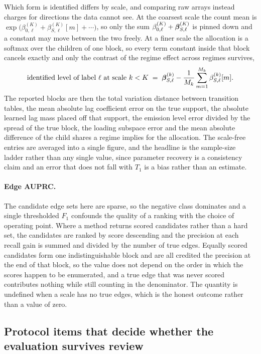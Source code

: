 Which form is identified differs by scale, and comparing raw arrays instead
charges for directions the data cannot see. At the coarsest scale the count
mean is
\(\exp\bigl(\beta_{0,\ell}^{(K)} + \beta_{S,\ell}^{(K)}[m] + \cdots\bigr)\), so
only the sum \(\beta_{0,\ell}^{(K)} + {\boldsymbol{\beta}}_{S,\ell}^{(K)}\) is pinned down and
a constant may move between the two freely. At a finer scale the allocation is
a softmax over the children of one block, so every term constant inside that
block cancels exactly and only the contrast of the regime effect across regimes
survives,
\begin{align}
\text{identified level of label } \ell \text{ at scale } k < K
\;=\;
{\boldsymbol{\beta}}_{S,\ell}^{(k)}
- \frac{1}{M_k}\sum_{m=1}^{M_k} \beta_{S,\ell}^{(k)}[m].
\label{eq:bench_identified}
\end{align}
The reported blocks are then the total variation distance between transition
tables, the mean absolute lag coefficient error on the true support, the
absolute learned lag mass placed off that support, the emission level error
divided by the spread of the true block, the loading subspace error and the
mean absolute difference of the child shares a regime implies for the
allocation. The scale-free entries are averaged into a single figure, and the
headline is the sample-size ladder rather than any single value, since
parameter recovery is a consistency claim and an error that does not fall with
\(T_1\) is a bias rather than an estimate.

\paragraph{Edge AUPRC.}
The candidate edge sets here are sparse, so the negative class dominates and a
single thresholded \(F_1\) confounds the quality of a ranking with the choice
of operating point. Where a method returns scored candidates rather than a
hard set, the candidates are ranked by score descending and the precision at
each recall gain is summed and divided by the number of true edges. Equally
scored candidates form one indistinguishable block and are all credited the
precision at the end of that block, so the value does not depend on the order
in which the scores happen to be enumerated, and a true edge that was never
scored contributes nothing while still counting in the denominator. The
quantity is undefined when a scale has no true edges, which is the honest
outcome rather than a value of zero.

\subsection{Protocol items that decide whether the evaluation survives review}
\label{sec:benchmark_review}

